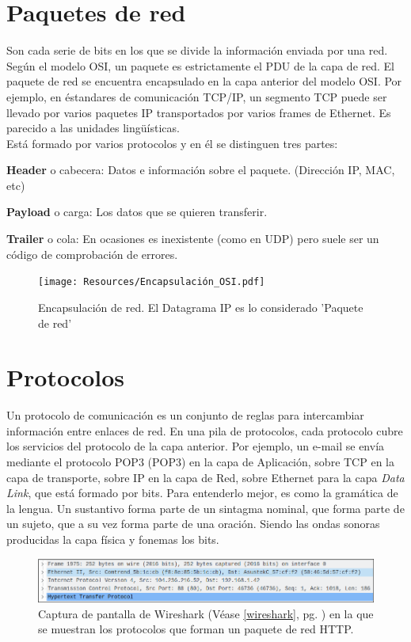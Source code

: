 \documentclass[a4paper, 11pt]{report} %
\newcommand{\acr}[1]{\acrshort{#1} (\acrlong{#1})}
\begin{document}
%
\newpage
\section{Paquetes de red}
Son cada serie de bits en los que se divide la información enviada por una red. \\ Según el modelo OSI, un paquete es estrictamente el PDU de la capa de red. El paquete de red se encuentra encapsulado en la capa anterior del modelo OSI. Por ejemplo, en éstandares de comunicación TCP/IP, un segmento TCP puede ser llevado por varios paquetes IP transportados por varios frames de Ethernet. Es parecido a las unidades lingüísticas. \\Está formado por varios protocolos y en él se distinguen tres partes:
\begin{description}
\item \textbf{Header} o cabecera: Datos e información sobre el paquete. (Dirección IP, MAC, etc)
\item \textbf{Payload} o carga: Los datos que se quieren transferir.
\item \textbf{Trailer} o cola: En ocasiones es inexistente (como en UDP) pero suele ser un código de comprobación de errores.
\end{description}

\vspace{1cm}
\begin{figure}[H]
\noindent
\centering
\texttt{[image: Resources/Encapsulación\_OSI.pdf]}
\caption{Encapsulación de red. El Datagrama IP es lo considerado 'Paquete de red'}
\end{figure}
\vspace{\fill}
\newpage

\section{Protocolos}
Un protocolo de comunicación es un conjunto de reglas para intercambiar información entre enlaces de red. En una pila de protocolos, cada protocolo cubre los servicios del protocolo de la capa anterior. Por ejemplo, un e-mail se envía mediante el protocolo \acr{POP3} en la capa de Aplicación, sobre TCP en la capa de transporte, sobre IP en la capa de Red, sobre Ethernet para la capa \textit{Data Link}, que está formado por bits. Para entenderlo mejor, es como la gramática de la lengua. Un sustantivo forma parte de un sintagma nominal, que forma parte de un sujeto, que a su vez forma parte de una oración. Siendo las ondas sonoras producidas la capa física y fonemas los bits.
\begin{figure}[H]
\noindent
\includegraphics[width=\textwidth]{Resources/Wireshark01.png}
\caption[Captura de pantalla de Wireshark]{Captura de pantalla de Wireshark (Véase \ref{wireshark}, pg. \pageref{wireshark}) en la que se muestran los protocolos que forman un paquete de red HTTP.}
\end{figure}
\end{document}

